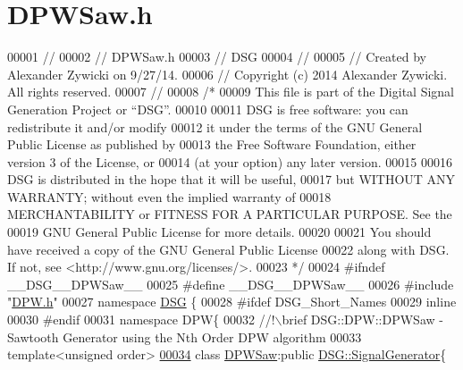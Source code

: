 \hypertarget{_d_p_w_saw_8h_source}{\section{D\+P\+W\+Saw.\+h}
\label{_d_p_w_saw_8h_source}
}

\begin{DoxyCode}
00001 \textcolor{comment}{//}
00002 \textcolor{comment}{//  DPWSaw.h}
00003 \textcolor{comment}{//  DSG}
00004 \textcolor{comment}{//}
00005 \textcolor{comment}{//  Created by Alexander Zywicki on 9/27/14.}
00006 \textcolor{comment}{//  Copyright (c) 2014 Alexander Zywicki. All rights reserved.}
00007 \textcolor{comment}{//}
00008 \textcolor{comment}{/*}
00009 \textcolor{comment}{ This file is part of the Digital Signal Generation Project or “DSG”.}
00010 \textcolor{comment}{}
00011 \textcolor{comment}{ DSG is free software: you can redistribute it and/or modify}
00012 \textcolor{comment}{ it under the terms of the GNU General Public License as published by}
00013 \textcolor{comment}{ the Free Software Foundation, either version 3 of the License, or}
00014 \textcolor{comment}{ (at your option) any later version.}
00015 \textcolor{comment}{}
00016 \textcolor{comment}{ DSG is distributed in the hope that it will be useful,}
00017 \textcolor{comment}{ but WITHOUT ANY WARRANTY; without even the implied warranty of}
00018 \textcolor{comment}{ MERCHANTABILITY or FITNESS FOR A PARTICULAR PURPOSE.  See the}
00019 \textcolor{comment}{ GNU General Public License for more details.}
00020 \textcolor{comment}{}
00021 \textcolor{comment}{ You should have received a copy of the GNU General Public License}
00022 \textcolor{comment}{ along with DSG.  If not, see <http://www.gnu.org/licenses/>.}
00023 \textcolor{comment}{ */}
00024 \textcolor{preprocessor}{#ifndef \_\_DSG\_\_DPWSaw\_\_}
00025 \textcolor{preprocessor}{#define \_\_DSG\_\_DPWSaw\_\_}
00026 \textcolor{preprocessor}{#include "\hyperlink{_d_p_w_8h}{DPW.h}"}
00027 \textcolor{keyword}{namespace }\hyperlink{namespace_d_s_g}{DSG} \{
00028 \textcolor{preprocessor}{#ifdef DSG\_Short\_Names}
00029     \textcolor{keyword}{inline}
00030 \textcolor{preprocessor}{#endif}
00031     \textcolor{keyword}{namespace }DPW\{\textcolor{comment}{}
00032 \textcolor{comment}{        //!\(\backslash\)brief DSG::DPW::DPWSaw - Sawtooth Generator using the Nth Order DPW algorithm }
00033 \textcolor{comment}{}        \textcolor{keyword}{template}<\textcolor{keywordtype}{unsigned} order>
\hypertarget{_d_p_w_saw_8h_source_l00034}{}\hyperlink{class_d_s_g_1_1_d_p_w_1_1_d_p_w_saw}{00034}         \textcolor{keyword}{class }\hyperlink{class_d_s_g_1_1_d_p_w_1_1_d_p_w_saw}{DPWSaw}:\textcolor{keyword}{public} \hyperlink{class_d_s_g_1_1_signal_generator}{DSG::SignalGenerator}\{

\end{DoxyCode}
